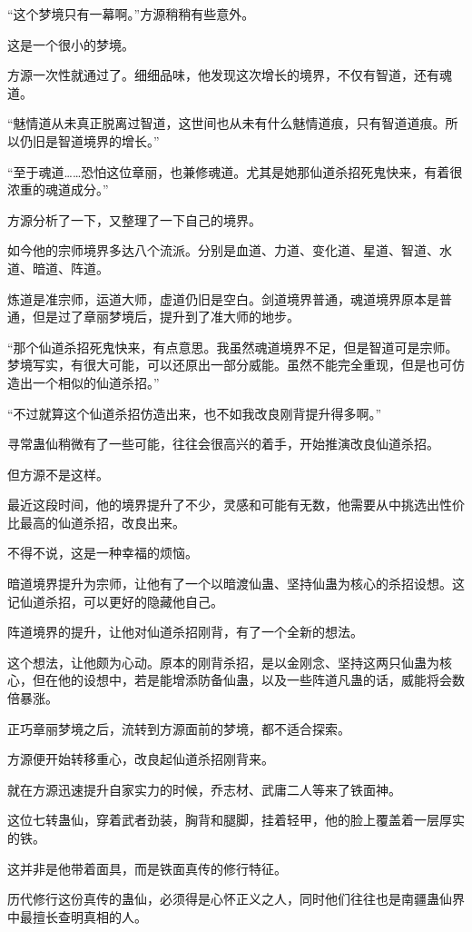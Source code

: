 \begin{this_body}
“这个梦境只有一幕啊。”方源稍稍有些意外。

这是一个很小的梦境。

方源一次性就通过了。细细品味，他发现这次增长的境界，不仅有智道，还有魂道。

“魅情道从未真正脱离过智道，这世间也从未有什么魅情道痕，只有智道道痕。所以仍旧是智道境界的增长。”

“至于魂道……恐怕这位章丽，也兼修魂道。尤其是她那仙道杀招死鬼快来，有着很浓重的魂道成分。”

方源分析了一下，又整理了一下自己的境界。

如今他的宗师境界多达八个流派。分别是血道、力道、变化道、星道、智道、水道、暗道、阵道。

炼道是准宗师，运道大师，虚道仍旧是空白。剑道境界普通，魂道境界原本是普通，但是过了章丽梦境后，提升到了准大师的地步。

“那个仙道杀招死鬼快来，有点意思。我虽然魂道境界不足，但是智道可是宗师。梦境写实，有很大可能，可以还原出一部分威能。虽然不能完全重现，但是也可仿造出一个相似的仙道杀招。”

“不过就算这个仙道杀招仿造出来，也不如我改良刚背提升得多啊。”

寻常蛊仙稍微有了一些可能，往往会很高兴的着手，开始推演改良仙道杀招。

但方源不是这样。

最近这段时间，他的境界提升了不少，灵感和可能有无数，他需要从中挑选出性价比最高的仙道杀招，改良出来。

不得不说，这是一种幸福的烦恼。

暗道境界提升为宗师，让他有了一个以暗渡仙蛊、坚持仙蛊为核心的杀招设想。这记仙道杀招，可以更好的隐藏他自己。

阵道境界的提升，让他对仙道杀招刚背，有了一个全新的想法。

这个想法，让他颇为心动。原本的刚背杀招，是以金刚念、坚持这两只仙蛊为核心，但在他的设想中，若是能增添防备仙蛊，以及一些阵道凡蛊的话，威能将会数倍暴涨。

正巧章丽梦境之后，流转到方源面前的梦境，都不适合探索。

方源便开始转移重心，改良起仙道杀招刚背来。

就在方源迅速提升自家实力的时候，乔志材、武庸二人等来了铁面神。

这位七转蛊仙，穿着武者劲装，胸背和腿脚，挂着轻甲，他的脸上覆盖着一层厚实的铁。

这并非是他带着面具，而是铁面真传的修行特征。

历代修行这份真传的蛊仙，必须得是心怀正义之人，同时他们往往也是南疆蛊仙界中最擅长查明真相的人。


\end{this_body}
